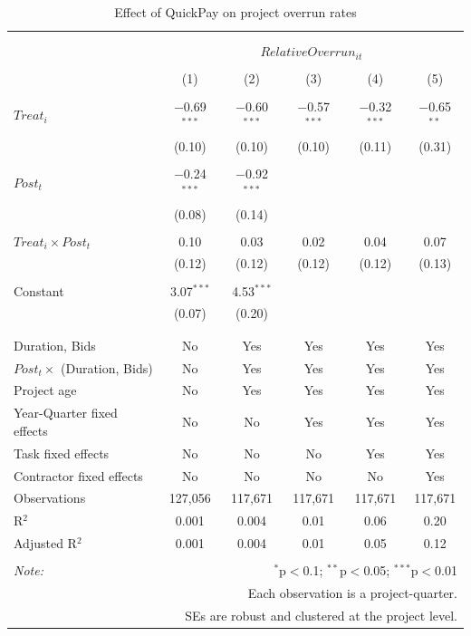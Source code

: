 \documentclass[
]{article}
\begin{document}
\begin{table}[H] \centering 
  \caption{Effect of QuickPay on project overrun rates} 
  \label{} 
\small 
\begin{tabular}{@{\extracolsep{-2pt}}lccccc} 
\\[-1.8ex]\hline 
\hline \\[-1.8ex] 
\\[-1.8ex] & \multicolumn{5}{c}{$RelativeOverrun_{it}$} \\ 
\\[-1.8ex] & (1) & (2) & (3) & (4) & (5)\\ 
\hline \\[-1.8ex] 
 $Treat_i$ & $-$0.69$^{***}$ & $-$0.60$^{***}$ & $-$0.57$^{***}$ & $-$0.32$^{***}$ & $-$0.65$^{**}$ \\ 
  & (0.10) & (0.10) & (0.10) & (0.11) & (0.31) \\ 
  & & & & & \\ 
 $Post_t$ & $-$0.24$^{***}$ & $-$0.92$^{***}$ &  &  &  \\ 
  & (0.08) & (0.14) &  &  &  \\ 
  & & & & & \\ 
 $Treat_i \times Post_t$ & 0.10 & 0.03 & 0.02 & 0.04 & 0.07 \\ 
  & (0.12) & (0.12) & (0.12) & (0.12) & (0.13) \\ 
  & & & & & \\ 
 Constant & 3.07$^{***}$ & 4.53$^{***}$ &  &  &  \\ 
  & (0.07) & (0.20) &  &  &  \\ 
  & & & & & \\ 
\hline \\[-1.8ex] 
Duration, Bids & No & Yes & Yes & Yes & Yes \\ 
$Post_t \times$  (Duration, Bids) & No & Yes & Yes & Yes & Yes \\ 
Project age & No & Yes & Yes & Yes & Yes \\ 
Year-Quarter fixed effects & No & No & Yes & Yes & Yes \\ 
Task fixed effects & No & No & No & Yes & Yes \\ 
Contractor fixed effects & No & No & No & No & Yes \\ 
Observations & 127,056 & 117,671 & 117,671 & 117,671 & 117,671 \\ 
R$^{2}$ & 0.001 & 0.004 & 0.01 & 0.06 & 0.20 \\ 
Adjusted R$^{2}$ & 0.001 & 0.004 & 0.01 & 0.05 & 0.12 \\ 
\hline 
\hline \\[-1.8ex] 
\textit{Note:}  & \multicolumn{5}{r}{$^{*}$p$<$0.1; $^{**}$p$<$0.05; $^{***}$p$<$0.01} \\ 
 & \multicolumn{5}{r}{Each observation is a project-quarter.} \\ 
 & \multicolumn{5}{r}{SEs are robust and clustered at the project level.} \\ 
\end{tabular} 
\end{table}
\end{document}
